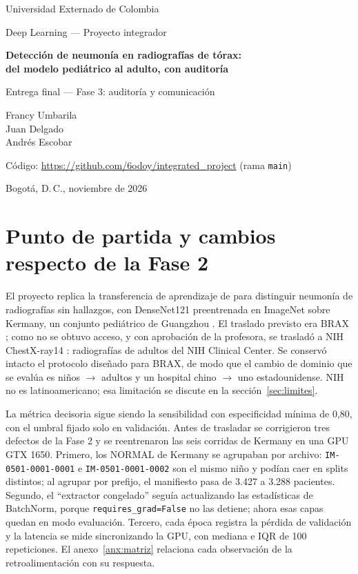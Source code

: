 \documentclass[11pt]{article}
\begin{document}
\begin{titlepage}
\centering
{\large Universidad Externado de Colombia\par}
{\large Deep Learning --- Proyecto integrador\par}
\vspace{4cm}
{\LARGE\bfseries Detección de neumonía en radiografías de tórax:\\[2pt] del modelo pediátrico al adulto, con auditoría\par}
\vspace{1cm}
{\Large Entrega final --- Fase 3: auditoría y comunicación\par}
\vspace{3cm}
{\large Francy Umbarila\\ Juan Delgado\\ Andrés Escobar\par}
\vfill
{Código: \url{https://github.com/6odoy/integrated_project} (rama \texttt{main})\par}
\vspace{.5cm}
{Bogotá, D.\,C., noviembre de 2026\par}
\end{titlepage}

\section{Punto de partida y cambios respecto de la Fase 2}
El proyecto replica la transferencia de aprendizaje de \textcite{rahman2020} para distinguir neumonía de radiografías sin hallazgos, con DenseNet121 preentrenada en ImageNet \parencite{huang2017} sobre Kermany, un conjunto pediátrico de Guangzhou \parencite{kermany2018}. El traslado previsto era BRAX \parencite{reis2022a}; como no se obtuvo acceso, y con aprobación de la profesora, se trasladó a NIH ChestX-ray14 \parencite{wang2017}: radiografías de adultos del NIH Clinical Center. Se conservó intacto el protocolo diseñado para BRAX, de modo que el cambio de dominio que se evalúa es niños $\rightarrow$ adultos y un hospital chino $\rightarrow$ uno estadounidense. NIH no es latinoamericano; esa limitación se discute en la sección~\ref{sec:limites}.

La métrica decisoria sigue siendo la sensibilidad con especificidad mínima de 0,80, con el umbral fijado solo en validación. Antes de trasladar se corrigieron tres defectos de la Fase 2 y se reentrenaron las seis corridas de Kermany en una GPU GTX 1650. Primero, los NORMAL de Kermany se agrupaban por archivo: \texttt{IM-0501-0001-0001} e \texttt{IM-0501-0001-0002} son el mismo niño y podían caer en splits distintos; al agrupar por prefijo, el manifiesto pasa de 3.427 a 3.288 pacientes. Segundo, el ``extractor congelado'' seguía actualizando las estadísticas de BatchNorm, porque \texttt{requires\_grad=False} no las detiene; ahora esas capas quedan en modo evaluación. Tercero, cada época registra la pérdida de validación y la latencia se mide sincronizando la GPU, con mediana e IQR de 100 repeticiones. El anexo~\ref{anx:matriz} relaciona cada observación de la retroalimentación con su respuesta.
\end{document}
